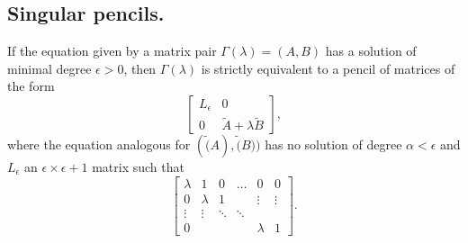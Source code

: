 \subsection*{Singular pencils.}
\begin{theorem}
    If the equation given by a matrix pair \(\Gamma(\lambda) = (A, B)\) has a solution of minimal
    degree \(\epsilon > 0\), then \(\Gamma(\lambda)\) is strictly equivalent to a pencil of matrices of the form
    \[
        \begin{bmatrix}
            L_{\epsilon} & 0 \\
            0 & \tilde{A} + \lambda \tilde{B}
        \end{bmatrix},
    \]
    where the equation analogous for \((\tilde(A), \tilde(B))\) has no solution of degree \(\alpha < \epsilon\) and
    \(L_{\epsilon}\) an \(\epsilon \times \epsilon + 1\) matrix such that
    \[
        \begin{bmatrix}
            \lambda & 1       & 0     & \hdots & 0       &    0   \\
            0       & \lambda & 1     &        & \vdots  & \vdots \\
            \vdots  & \vdots & \ddots & \ddots \\
            0       &        &        &        & \lambda & 1
        \end{bmatrix}.
    \]
\end{theorem}